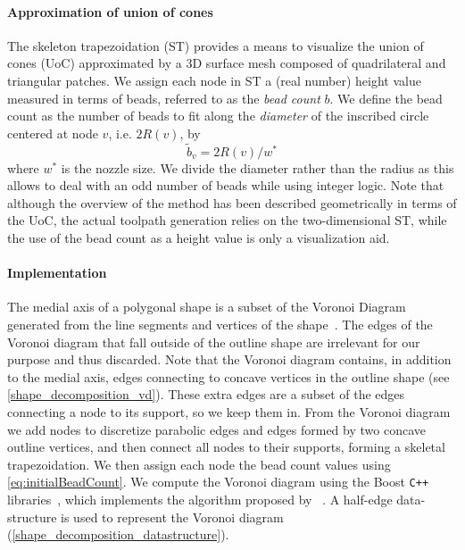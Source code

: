 \paragraph{Approximation of union of cones}
The skeleton trapezoidation (ST) provides a means to visualize the union of cones (UoC) approximated by a 3D surface mesh composed of quadrilateral and triangular patches.
We assign each node in ST a (real number) height value measured in terms of beads, referred to as the \emph{bead count} $b$.
We define the bead count as the number of beads to fit along the \emph{diameter} of the inscribed circle centered at node $v$, i.e. $2R(v)$, by
\begin{equation}
    \tilde{b}_v = 2 R(v) / w^*
\label{eq:initialBeadCount}
\end{equation}
where $w^*$ is the nozzle size. 
We divide the diameter rather than the radius as this allows to deal with an odd number of beads while using integer logic.
Note that although the overview of the method has been described geometrically in terms of the UoC, the actual toolpath generation relies on the two-dimensional ST, while the use of the bead count as a height value is only a visualization aid.







\paragraph{Implementation}
The medial axis of a polygonal shape is a subset of the Voronoi Diagram generated from the line segments and vertices of the shape~\cite{lee1982medial}. 
The edges of the Voronoi diagram that fall outside of the outline shape are irrelevant for our purpose and thus discarded.
Note that the Voronoi diagram contains, in addition to the medial axis, edges connecting to concave vertices in the outline shape (see \cref{shape_decomposition_vd}). 
These extra edges are a subset of the edges connecting a node to its support, so we keep them in.
From the Voronoi diagram we add nodes to discretize parabolic edges and edges formed by two concave outline vertices, and then connect all nodes to their supports, forming a skeletal trapezoidation. 
We then assign each node the bead count values using \cref{eq:initialBeadCount}.
We compute the Voronoi diagram using the Boost \verb!C++! libraries~\cite{schaling2011boost}, which implements the algorithm proposed by \citeauthor{fortune1986sascg}~\cite{fortune1986sascg}.
A half-edge data-structure is used to represent the Voronoi diagram (\cref{shape_decomposition_datastructure}).

